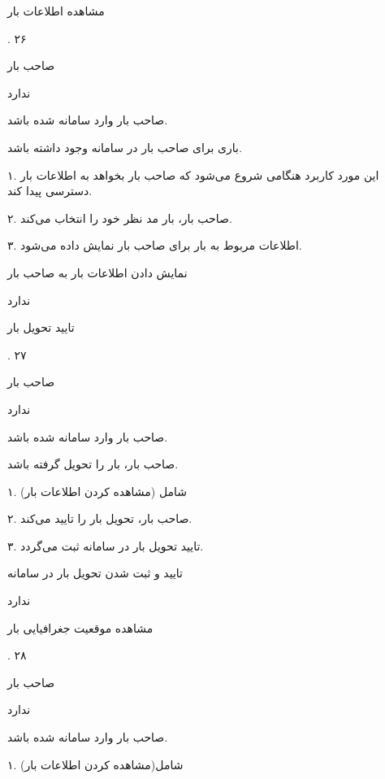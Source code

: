 \noindent \hrulefill

مشاهده اطلاعات بار

.
۲۶

صاحب بار

ندارد


صاحب بار وارد سامانه شده باشد.

باری برای صاحب بار در سامانه وجود داشته باشد.


۱. این مورد کاربرد هنگامی شروع می‌شود که صاحب بار بخواهد به اطلاعات بار دسترسی پیدا کند.

۲. صاحب بار، بار مد نظر خود را انتخاب می‌کند. 

۳. اطلاعات مربوط به بار برای صاحب بار نمایش داده می‌شود.

نمایش دادن اطلاعات بار به صاحب بار

ندارد

\noindent \hrulefill

تایید تحویل بار

.
۲۷

صاحب بار

ندارد


صاحب بار وارد سامانه شده باشد.

صاحب بار، بار را تحویل گرفته باشد.


۱. شامل (مشاهده کردن اطلاعات بار)

۲. صاحب بار، تحویل بار را تایید می‌کند.

۳. تایید تحویل بار در سامانه ثبت می‌گردد.

تایید و ثبت شدن تحویل بار در سامانه

ندارد

\noindent \hrulefill

مشاهده موقعیت جغرافیایی بار

.
۲۸

صاحب بار

ندارد

صاحب بار وارد سامانه شده باشد.


۱. شامل(مشاهده کردن اطلاعات بار)

